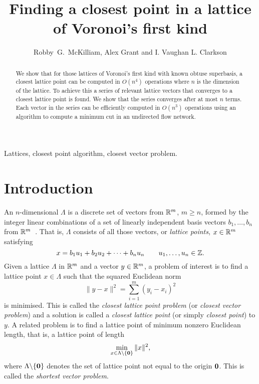 \documentclass[final,leqno]{siamltex}
\title{Finding a closest point in a lattice of Voronoi's first kind}
\author{Robby~G.~McKilliam, Alex Grant and I. Vaughan L. Clarkson}
\begin{document}
\maketitle

 \begin{abstract} 
We show that for those lattices of Voronoi's first kind with known obtuse superbasis, a closest lattice point can be computed in $O(n^4)$ operations where $n$ is the dimension of the lattice.  To achieve this a series of relevant lattice vectors that converges to a closest lattice point is found.  We show that the series converges after at most $n$ terms.  Each vector in the series can be efficiently computed in $O(n^3)$ operations using an algorithm to compute a minimum cut in an undirected flow network.  %
\end{abstract}

\begin{keywords}
Lattices, closest point algorithm, closest vector problem.
\end{keywords}

\pagestyle{myheadings}
\thispagestyle{plain} 
 

\section{Introduction}\label{sec:introduction}

An $n$-dimensional  $\Lambda$ is a discrete set of vectors from ${\mathbb R}^m$, $m \geq n$, formed by the integer linear combinations of a set of linearly independent basis vectors $b_1, \dots, b_n$ from ${\mathbb R}^m$~\cite{SPLAG}.  That is, $\Lambda$ consists of all those vectors, or \emph{lattice points}, $x \in {\mathbb R}^m$ satisfying
\[
  x = b_1 u_1 + b_2u_2 + \dots + b_n u_n \qquad u_1, \dots , u_n \in {\mathbb Z}. 
\] 
Given a lattice $\Lambda$ in ${\mathbb R}^m$ and a vector $y \in {\mathbb R}^m$, a problem of interest is to find a lattice point $x \in \Lambda$ such that the squared Euclidean norm
\[
\| y - x \|^2 = \sum_{i=1}^m (y_i - x_i)^2
\] 
is minimised.  This is called the \emph{closest lattice point problem} (or \emph{closest vector problem}) and a solution is called a \emph{closest lattice point} (or simply \emph{closest point}) to $y$. %
A related problem is to find a lattice point of minimum nonzero Euclidean length, that is, a lattice point of length
\[
\min_{x\in \Lambda \backslash \{ \boldsymbol{0} \} } \| x \|^2,
\]
where $\Lambda \backslash  \{\boldsymbol{0}\}$ denotes the set of lattice point not equal to the origin $\boldsymbol{0}$.  This is called the \emph{shortest vector problem}.
\end{document}
